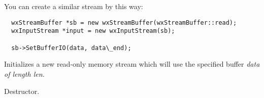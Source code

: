 \section{}\label{wxmeminputstream}






You can create a similar stream by this way:
\begin{verbatim}
  wxStreamBuffer *sb = new wxStreamBuffer(wxStreamBuffer::read);
  wxInputStream *input = new wxInputStream(sb);

  sb->SetBufferIO(data, data\_end);
\end{verbatim}




Initializes a new read-only memory stream which will use the specified buffer
\it{data} of length \it{len}.



Destructor.

\section{}\label{wxmemoutputstream}






